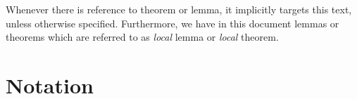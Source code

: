 \begin{center}
Whenever there is reference to theorem or lemma, it implicitly
targets this text, unless otherwise specified.
Furthermore, we have in this document lemmas or theorems
which are referred to as \emph{local} lemma
or \emph{local} theorem.
\end{center}

\section*{Notation}




\iftrue
 
 
 
 
\else
\fi


% 



\printindex



